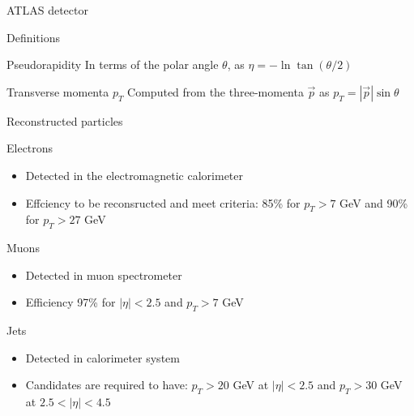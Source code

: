 \documentclass[10pt]{beamer} %
\begin{document}
\begin{frame}{ATLAS detector}
\end{frame}





\begin{frame}{Definitions}
\begin{block}{Pseudorapidity}
In terms of the polar angle $\theta$, as $\eta = - \ln {\tan(\theta/2)}$
\end{block}    

\begin{block}{Transverse momenta $p_T$}
Computed from the three-momenta $\vec{p}$ as $p_T= |\vec{p}| \sin{\theta}$
\end{block}    

\end{frame}



\begin{frame}{Reconstructed particles}
    

\begin{block}{Electrons}
    \begin{itemize}
        \item Detected in the electromagnetic calorimeter
        \item Effciency to be reconsructed and meet criteria: 85\% for $p_T > 7$ GeV and 90\% for $p_T > 27$ GeV
    \end{itemize}
\end{block}

\begin{block}{Muons}
    \begin{itemize}
        \item Detected in muon spectrometer
        \item Efficiency 97\% for $|\eta|<2.5$ and $p_T >7$ GeV
    \end{itemize}
\end{block}

\begin{block}{Jets}
\begin{itemize}
    \item Detected in calorimeter system
    \item Candidates are required to have: $p_T >20$ GeV at $|\eta|<2.5$ and $p_T >30$ GeV at $2.5<|\eta|<4.5$ 
\end{itemize}

\end{block}

\end{frame}
\end{document}
